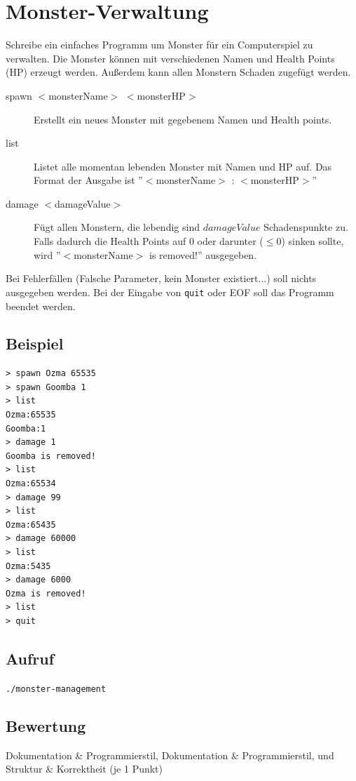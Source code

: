 \documentclass[a4paper,10pt]{article}
\begin{document}
\section*{Monster-Verwaltung}

Schreibe ein einfaches Programm um Monster für ein Computerspiel zu verwalten. Die Monster können mit verschiedenen Namen und Health Points (HP) erzeugt werden. Außerdem kann allen Monstern Schaden zugefügt werden.

\begin{description}
 \item[spawn $<$monsterName$>$ $<$monsterHP$>$] Erstellt ein neues Monster mit gegebenem Namen und Health points.
 \item[list] Listet alle momentan lebenden Monster mit Namen und HP auf. Das Format der Ausgabe ist ''$<$monsterName$>$ : $<$monsterHP$>$''
 \item[damage $<$damageValue$>$] Fügt allen Monstern, die lebendig sind $damageValue$ Schadenspunkte zu. Falls dadurch die Health Points auf 0 oder darunter ($\leq 0$) sinken sollte, wird ''$<$monsterName$>$ is removed!'' ausgegeben.
\end{description}

Bei Fehlerfällen (Falsche Parameter, kein Monster existiert...) soll nichts ausgegeben werden.
Bei der Eingabe von \texttt{quit} oder EOF soll das Programm beendet werden.

\subsection*{Beispiel}
\begin{verbatim}
> spawn Ozma 65535
> spawn Goomba 1
> list
Ozma:65535
Goomba:1
> damage 1
Goomba is removed!
> list
Ozma:65534
> damage 99
> list
Ozma:65435
> damage 60000
> list
Ozma:5435
> damage 6000
Ozma is removed!
> list
> quit

\end{verbatim}

\subsection*{Aufruf}
\texttt{./monster-management}

\subsection*{Bewertung}
Dokumentation \& Programmierstil,  Dokumentation \& Programmierstil, und Struktur \& Korrektheit (je 1 Punkt)
\newpage
\end{document}
